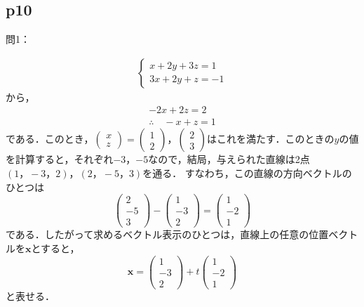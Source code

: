 \documentclass[dvipdfmx,uplatex,11pt]{jsarticle}
\theoremstyle{definition}
\begin{document}
\subsection{p10}
%
問1：
\begin{leftbar}
\begin{align*}
    \begin{cases}
        x+2y+3z=1 \\
        3x+2y+z=-1
    \end{cases}
\end{align*}
から，
\begin{gather*}
    -2x+2z=2 \\
    \therefore \quad -x+z=1
\end{gather*}
である．このとき，$
\left(
    \begin{array}{c}
        x \\
        z
    \end{array}
\right) =
\left(
    \begin{array}{c}
        1 \\
        2
    \end{array}
\right)，
\left(
    \begin{array}{c}
        2 \\
        3
    \end{array}
\right)
$はこれを満たす．このときの$y$の値を計算すると，それぞれ$-3$，$-5$なので，結局，与えられた直線は2点$(1，-3，2)，(2，-5，3)$を通る．
すなわち，この直線の方向ベクトルのひとつは\[
    \left(
\begin{array}{c}
    2 \\
    -5 \\
    3
\end{array}
    \right)
    -
    \left(
        \begin{array}{c}
            1 \\
            -3 \\
            2
        \end{array}
            \right)
            =
            \left(
                \begin{array}{c}
                    1 \\
                    -2 \\
                    1
                \end{array}
                    \right)
                    \]
である．したがって求めるベクトル表示のひとつは，直線上の任意の位置ベクトルを$\bm{x}$とすると，
\[
    \bm{x}= \left(
        \begin{array}{c}
            1 \\
            -3 \\
            2
        \end{array}
            \right)
            +t
            \left(
            \begin{array}{c}
                1 \\
                -2 \\
                1
            \end{array}
            \right)
            \]
            と表せる．
\end{leftbar}
\end{document}
